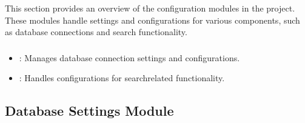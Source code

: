 \documentclass[letterpaper,10pt,english]{sphinxmanual}
\begin{document}
\sphinxAtStartPar
This section provides an overview of the configuration modules in the project. These modules handle settings and configurations for various components, such as database connections and search functionality.
\subsubsection*{}
\begin{itemize}
\item {} 
\sphinxAtStartPar
{}: Manages database connection settings and configurations.

\item {} 
\sphinxAtStartPar
{}: Handles configurations for search\sphinxhyphen{}related functionality.

\end{itemize}


\subsection{Database Settings Module}
\label{\detokenize{config:module-config.db}}\label{\detokenize{config:database-settings-module}}
\end{document}
